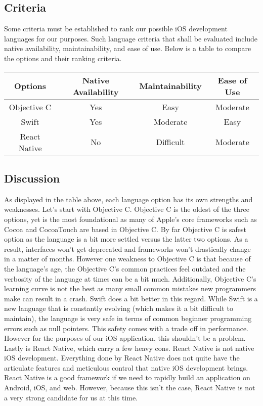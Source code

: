 \documentclass[letterpaper,10pt,titlepage]{article}
\begin{document}
\subsection{Criteria}

Some criteria must be established to rank our possible iOS development languages for our purposes. Such language criteria that shall be evaluated include native availability, maintainability, and ease of use. Below is a table to compare the options and their ranking criteria.\\

\begin{center}
\begin{tabular}{ |c|c|c|c| }
 \hline
 Options & Native Availability & Maintainability & Ease of Use \\ \hline
 Objective C & Yes & Easy & Moderate \\ \hline
 Swift & Yes & Moderate & Easy \\ \hline
 React Native & No & Difficult & Moderate \\
 \hline
\end{tabular}
\end{center}

\subsection{Discussion}

As displayed in the table above, each language option has its own strengths and weaknesses. Let's start with Objective C. Objective C is the oldest of the three options, yet is the most foundational as many of Apple's core frameworks such as Cocoa and CocoaTouch are based in Objective C. By far Objective C is safest option as the language is a bit more settled versus the latter two options. As a result, interfaces won't get deprecated and frameworks won't drastically change in a matter of months. However one weakness to Objective C is that because of the language's age, the Objective C's common practices feel outdated and the verbosity of the language at times can be a bit much. Additionally, Objective C's learning curve is not the best as many small common mistakes new programmers make can result in a crash. Swift does a bit better in this regard. While Swift is a new language that is constantly evolving (which makes it a bit difficult to maintain), the language is very safe in terms of common beginner programming errors such as null pointers. This safety comes with a trade off in performance. However for the purposes of our iOS application, this shouldn't be a problem. Lastly is React Native, which carry a few heavy cons. React Native is not native iOS development. Everything done by React Native does not quite have the articulate features and meticulous control that native iOS development brings. React Native is a good framework if we need to rapidly build an application on Android, iOS, and web. However, because this isn't the case, React Native is not a very strong candidate for us at this time.
\end{document}
